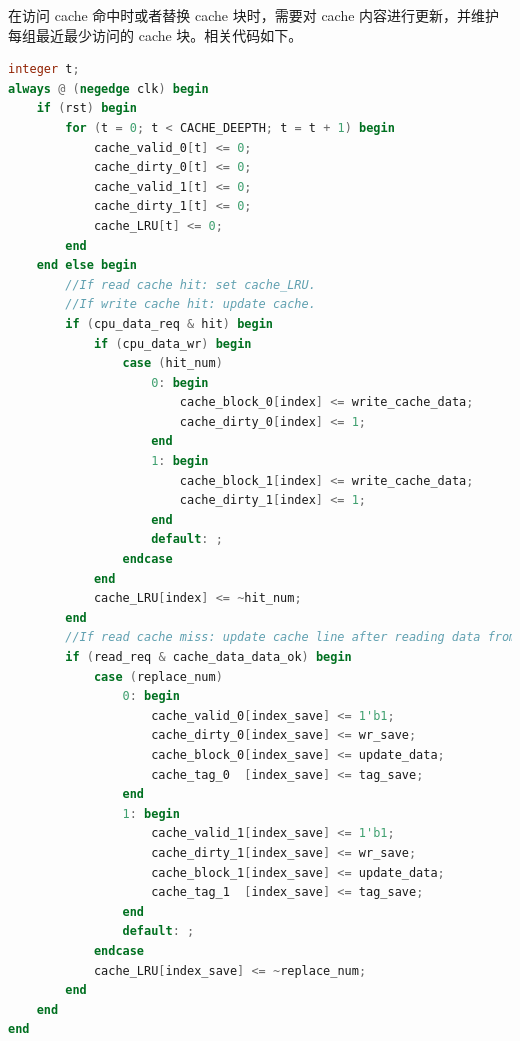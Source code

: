 在访问 cache 命中时或者替换 cache 块时，需要对 cache 内容进行更新，并维护每组最近最少访问的 cache 块。相关代码如下。

\begin{lstlisting}[language=Verilog]
integer t;
always @ (negedge clk) begin
    if (rst) begin
        for (t = 0; t < CACHE_DEEPTH; t = t + 1) begin
            cache_valid_0[t] <= 0;
            cache_dirty_0[t] <= 0;
            cache_valid_1[t] <= 0;
            cache_dirty_1[t] <= 0;
            cache_LRU[t] <= 0;
        end
    end else begin
        //If read cache hit: set cache_LRU.
        //If write cache hit: update cache.
        if (cpu_data_req & hit) begin
            if (cpu_data_wr) begin
                case (hit_num)
                    0: begin
                        cache_block_0[index] <= write_cache_data;
                        cache_dirty_0[index] <= 1;
                    end
                    1: begin
                        cache_block_1[index] <= write_cache_data;
                        cache_dirty_1[index] <= 1;
                    end
                    default: ;
                endcase
            end
            cache_LRU[index] <= ~hit_num;
        end
        //If read cache miss: update cache line after reading data from memory
        if (read_req & cache_data_data_ok) begin
            case (replace_num)
                0: begin
                    cache_valid_0[index_save] <= 1'b1;
                    cache_dirty_0[index_save] <= wr_save;
                    cache_block_0[index_save] <= update_data;
                    cache_tag_0  [index_save] <= tag_save;
                end
                1: begin
                    cache_valid_1[index_save] <= 1'b1;
                    cache_dirty_1[index_save] <= wr_save;
                    cache_block_1[index_save] <= update_data;
                    cache_tag_1  [index_save] <= tag_save;
                end
                default: ;
            endcase
            cache_LRU[index_save] <= ~replace_num;
        end
    end
end
\end{lstlisting}
